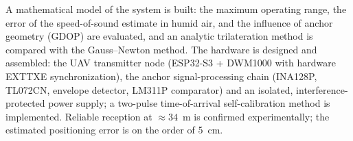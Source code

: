 A mathematical model of the system is built: the maximum operating range, the
error of the speed-of-sound estimate in humid air, and the influence of anchor
geometry (GDOP) are evaluated, and an analytic trilateration method is compared
with the Gauss--Newton method. The hardware is designed and assembled: the UAV
transmitter node (ESP32-S3 + DWM1000 with hardware EXTTXE synchronization), the
anchor signal-processing chain (INA128P, TL072CN, envelope detector, LM311P
comparator) and an isolated, interference-protected power supply; a two-pulse
time-of-arrival self-calibration method is implemented. Reliable reception at ${\approx}34$~m is
confirmed experimentally; the estimated positioning error is on the order of 5~cm.
